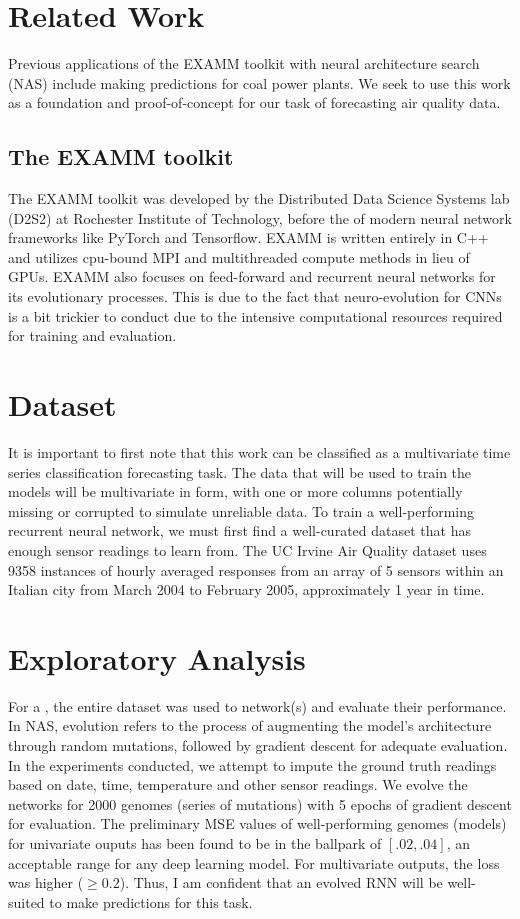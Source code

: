 \documentclass[12pt]{article}
\begin{document}
\section{Related Work}
Previous applications of the EXAMM\cite{ororbia_investigating_2019} toolkit with neural architecture search (NAS) include making predictions for coal power plants\cite{kaufmann_evolving_2019}. We seek to use this work as a foundation and proof-of-concept for our task of forecasting air quality data.
\subsection{The EXAMM toolkit}
The EXAMM toolkit was developed by the Distributed Data Science Systems lab (D2S2) at Rochester Institute of Technology, before the  of modern neural network frameworks like PyTorch and Tensorflow. EXAMM is written entirely in C++ and utilizes cpu-bound MPI and multithreaded compute methods in lieu of GPUs. EXAMM also focuses on feed-forward and recurrent neural networks for its evolutionary processes. This is due to the fact that neuro-evolution for CNNs is a bit trickier to conduct due to the intensive computational resources required for training and evaluation.

\section{Dataset}
It is important to first note that this work can be classified as a multivariate time series classification forecasting task. The data that will be used to train the models will be multivariate in form, with one or more columns potentially missing or corrupted to simulate unreliable data.
To train a well-performing recurrent neural network, we must first find a well-curated dataset that has enough sensor readings to learn from. The UC Irvine Air Quality dataset \cite{misc_air_quality_360} uses 9358 instances of hourly averaged responses from an array of 5 sensors within an Italian city from March 2004 to February 2005, approximately 1 year in time.

\section{Exploratory Analysis}
For a , the entire dataset was used to  network(s) and evaluate their performance. In NAS, evolution refers to the process of augmenting the model's architecture through random mutations, followed by gradient descent for adequate evaluation. In the experiments conducted, we attempt to impute the ground truth readings based on date, time, temperature and other sensor readings. We evolve the networks for 2000 genomes (series of mutations) with 5 epochs of gradient descent for evaluation. The preliminary MSE values of well-performing genomes (models) for univariate ouputs has been found to be in the ballpark of $[.02,.04]$, an acceptable range for any deep learning model. For multivariate outputs, the loss was higher ($\geq 0.2$). Thus, I am confident that an evolved RNN will be well-suited to make predictions for this task. 
\end{document}
